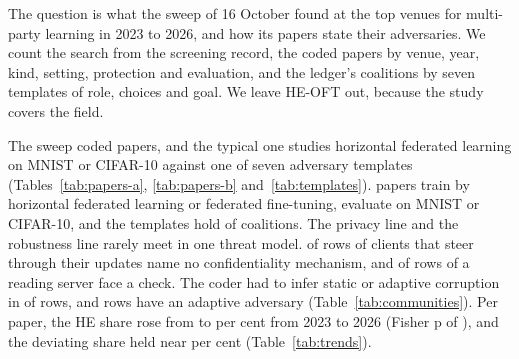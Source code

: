 \documentclass{labreport}
\begin{document}
\lrmaketitle

\lrscope
The question is what the sweep of 16 October found at the top venues for
multi-party learning in 2023 to 2026, and how its papers state their
adversaries. We count the search from the screening record, the coded papers by
venue, year, kind, setting, protection and evaluation, and the ledger's
coalitions by seven templates of role, choices and goal. We leave HE-OFT out,
because the study covers the field.

\lrresult
The sweep coded  papers, and the typical one studies horizontal
federated learning on MNIST or CIFAR-10 against one of seven adversary
templates (Tables~\ref{tab:papers-a}, \ref{tab:papers-b}
and~\ref{tab:templates}).  papers train by horizontal federated
learning or federated fine-tuning,  evaluate on MNIST or
CIFAR-10, and the templates hold  of  coalitions. The
privacy line and the robustness line rarely meet in one threat model.
 of  rows of clients that steer through their updates
name no confidentiality mechanism, and  of  rows of a
reading server face a check. The coder had to infer static or adaptive
corruption in  of  rows, and 
rows have an adaptive adversary (Table~\ref{tab:communities}). Per paper, the
HE share rose from  to  per cent from 2023 to 2026
(Fisher p of ), and the deviating share held near  per
cent (Table~\ref{tab:trends}).


\lrproduced
\begin{lrfacts}
\end{lrfacts}
\end{document}
